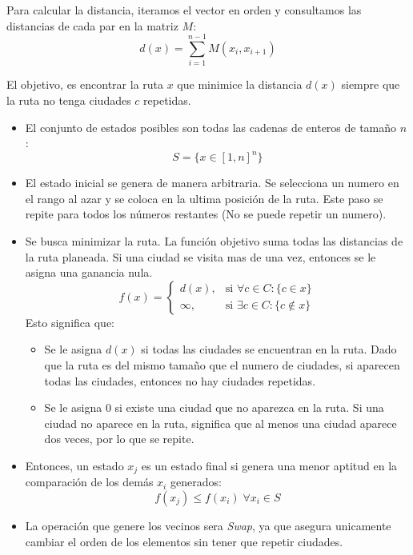 \documentclass[12pt,twoside]{article}
\begin{document}
	Para calcular la distancia, iteramos el vector en orden y consultamos las distancias de cada par en la matriz $M$: 
	\[ d(x) = \sum_{i = 1}^{n - 1} M(x_i, x_{i + 1}) \]
	
	El objetivo, es encontrar la ruta $x$ que minimice la distancia $d(x)$ siempre que la ruta no tenga ciudades $c$ repetidas.
	
	\begin{itemize}
		\item El conjunto de estados posibles son todas las cadenas de enteros de tamaño $n$: \[ S = \{ x \in [1, n]^n \} \]
		
		\item El estado inicial se genera de manera arbitraria. Se selecciona un numero en el rango al azar y se coloca en la ultima posición de la ruta. Este paso se repite para todos los números restantes (No se puede repetir un numero). 
	
		\item Se busca minimizar la ruta. La función objetivo suma todas las distancias de la ruta planeada. Si una ciudad se visita mas de una vez, entonces se le asigna una ganancia nula.
		\[
		f(x) =
		\begin{cases} 
			d(x), & \text{si } \forall c \in C \colon \{ c \in x \} \\ 
			\infty, & \text{si } \exists c \in C \colon \{c \notin x\}
		\end{cases}
		\]
		Esto significa que:
		\begin{itemize}
			\item Se le asigna $d(x)$ si todas las ciudades se encuentran en la ruta. Dado que la ruta es del mismo tamaño que el numero de ciudades, si aparecen todas las ciudades, entonces no hay ciudades repetidas.
			\item Se le asigna 0 si existe una ciudad que no aparezca en la ruta. Si una ciudad no aparece en la ruta, significa que al menos una ciudad aparece dos veces, por lo que se repite.
		\end{itemize}
	
	\item Entonces, un estado $x_j$ es un estado final si genera una menor aptitud en la comparación de los demás $x_i$ generados: \[ f(x_j) \leq f(x_i) \; \forall x_i \in S \]
	
	\item La operación que genere los vecinos sera \textit{Swap}, ya que asegura unicamente cambiar el orden de los elementos sin tener que repetir ciudades.
	\end{itemize}
	
\end{document}

